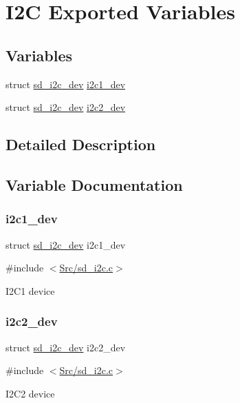 \hypertarget{group___s_d___i2_c___exported___variables}{}\section{I2C Exported Variables}
\label{group___s_d___i2_c___exported___variables}
\subsection*{Variables}
\begin{DoxyCompactItemize}
\item 
struct \mbox{\hyperlink{structsd__i2c__dev}{sd\+\_\+i2c\+\_\+dev}} \mbox{\hyperlink{group___s_d___i2_c___exported___variables_ga46fcd07cf43d192f6e66c43657a21d7b}{i2c1\+\_\+dev}}
\item 
struct \mbox{\hyperlink{structsd__i2c__dev}{sd\+\_\+i2c\+\_\+dev}} \mbox{\hyperlink{group___s_d___i2_c___exported___variables_gaf020fc820b9c33b80b636a363fd79912}{i2c2\+\_\+dev}}
\end{DoxyCompactItemize}


\subsection{Detailed Description}


\subsection{Variable Documentation}
\mbox{\label{group___s_d___i2_c___exported___variables_ga46fcd07cf43d192f6e66c43657a21d7b}} 
\subsubsection{\texorpdfstring{i2c1\+\_\+dev}{i2c1\_dev}}
{\footnotesize\ttfamily struct \mbox{\hyperlink{structsd__i2c__dev}{sd\+\_\+i2c\+\_\+dev}} i2c1\+\_\+dev}



{\ttfamily \#include $<$\mbox{\hyperlink{sd__i2c_8c}{Src/sd\+\_\+i2c.\+c}}$>$}

I2\+C1 device \mbox{\label{group___s_d___i2_c___exported___variables_gaf020fc820b9c33b80b636a363fd79912}} 
\subsubsection{\texorpdfstring{i2c2\+\_\+dev}{i2c2\_dev}}
{\footnotesize\ttfamily struct \mbox{\hyperlink{structsd__i2c__dev}{sd\+\_\+i2c\+\_\+dev}} i2c2\+\_\+dev}



{\ttfamily \#include $<$\mbox{\hyperlink{sd__i2c_8c}{Src/sd\+\_\+i2c.\+c}}$>$}

I2\+C2 device 